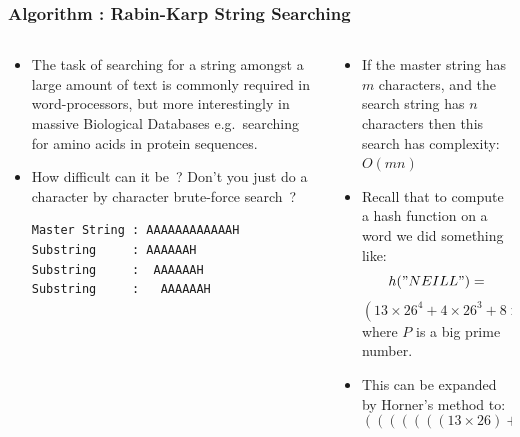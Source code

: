 
\begin{frame}[fragile]
\frametitle{Algorithm : Rabin-Karp String Searching}
\begin{columns}[T]

\begin{column}{0.40\textwidth}
\begin{itemize}[<+->]
\item The task of searching for a string amongst a large
amount of text is commonly required in word-processors,
but more interestingly in massive Biological Databases e.g.\ searching for amino acids in protein sequences.
\item How difficult can it be~? Don't you just do a character by
character brute-force search~?
\begin{verbatim}
Master String : AAAAAAAAAAAAH
Substring     : AAAAAAH
Substring     :  AAAAAAH
Substring     :   AAAAAAH
\end{verbatim}
\end{itemize}
\end{column}

\pause
\begin{column}{0.50\textwidth}
\begin{itemize}[<+->]
\item If the master string has $m$ characters, and the search string has $n$ characters then this search has complexity: $O(mn)$
\item Recall that to compute a hash function on a word we did something like:
\[
h("NEILL") =
\]
{\scriptsize
\[
(13\times26^4 + 4\times26^3 + 8\times26^2 + 11\times26 + 11) \% P
\]
}
where $P$ is a big prime number.
\item This can be expanded by Horner's method to:
{\scriptsize
\[
(((((((13\times26)+ 4)\times26) + 8)\times26) + 11)\times26 + 11) \% P
\]
}
\end{itemize}
\end{column}

\end{columns}
\end{frame}


